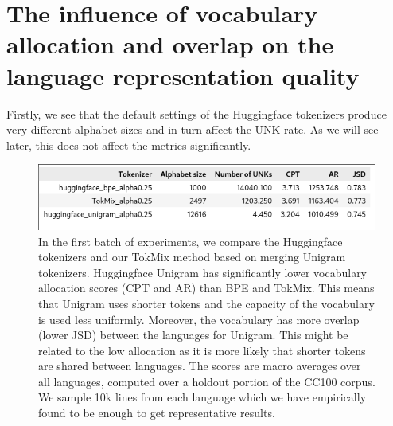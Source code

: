 \section{The influence of vocabulary allocation and overlap on the language representation quality}

Firstly, we see that the default settings of the Huggingface tokenizers produce very different alphabet sizes and in turn affect the UNK rate. As we will see later, this does not affect the metrics significantly.


\begin{figure}[H]
    \centering
    \includegraphics[width=\textwidth]{img/temp/20l_metrics.png}
    \caption{In the first batch of experiments, we compare the Huggingface tokenizers and our TokMix method based on merging Unigram tokenizers. Huggingface Unigram has significantly lower vocabulary allocation scores (CPT and AR) than BPE and TokMix. This means that Unigram uses shorter tokens and the capacity of the vocabulary is used less uniformly. Moreover, the vocabulary has more overlap (lower JSD) between the languages for Unigram. This might be related to the low allocation as it is more likely that shorter tokens are shared between languages. The scores are macro averages over all languages, computed over a holdout portion of the CC100 corpus. We sample 10k lines from each language which we have empirically found to be enough to get representative results.}
    \label{fig:20l_metrics}
\end{figure}


